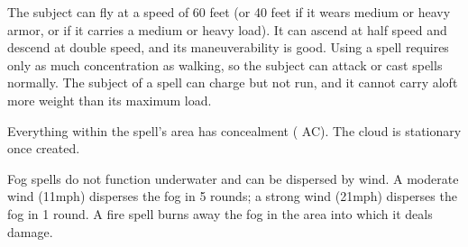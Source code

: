 \spellrng{\rngtouch}
\spelldur{\durshort}
\begin{spelleffect}
  The subject can fly at a speed of 60 feet (or 40 feet if it wears medium or heavy armor, or if it carries a medium or heavy load). It can ascend at half speed and descend at double speed, and its maneuverability is good. Using a  spell requires only as much concentration as walking, so the subject can attack or cast spells normally. The subject of a  spell can charge but not run, and it cannot carry aloft more weight than its maximum load.
\end{spelleffect}

\spellrng{\rngmed}
\spelldur{\durshort}
\begin{spelleffect}
  Everything within the spell's area has concealment ( AC). The cloud is stationary once created.
\end{spelleffect}
\begin{spellnotes}
  Fog spells do not function underwater and can be dispersed by wind. A moderate wind (11\add mph) disperses the fog in 5 rounds; a strong wind (21\add mph) disperses the fog in 1 round. A fire spell burns away the fog in the area into which it deals damage.
\end{spellnotes}

